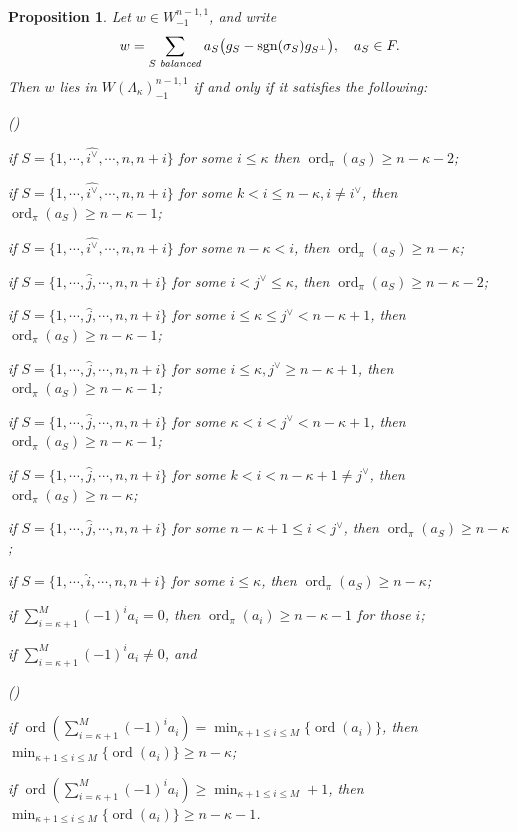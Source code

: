 \documentclass[pdflatex,sn-mathphys-num]{sn-jnl}%
\theoremstyle{thmstyleone}%
\newtheorem{proposition}[subsubsection]{Proposition}%
\theoremstyle{thmstyletwo}%
\numberwithin{equation}{subsection}
\theoremstyle{thmstylethree}%
\DeclareMathOperator{\ord}{ord}
\DeclareMathOperator{\sgn}{sgn}
\newcommand{\wh}{\widehat}
\newenvironment{altenumerate}
	{\begin{list}
			{(\theenumi) }
			{\usecounter{enumi}
				\setlength{\labelwidth}{0pt}
				\setlength{\labelsep}{0pt}
				\setlength{\leftmargin}{0pt}
				\setlength{\itemsep}{\the\smallskipamount}
				\renewcommand{\theenumi}{\roman{enumi}}
		}}
		{\end{list}}
\newenvironment{altenumerate2}
	{\begin{list}
			{\textup{(\theenumii)} }
			{\usecounter{enumii}
				\setlength{\labelwidth}{0pt}
				\setlength{\labelsep}{0pt}
				\setlength{\leftmargin}{2em}
				\setlength{\itemsep}{\the\smallskipamount}
				\renewcommand{\theenumii}{\alph{enumii}}
		}}
		{\end{list}}
\begin{document}
\begin{proposition}\label{equ_ss-comp:lattice}
	Let $w \in W_{-1}^{n-1,1}$, and write
\begin{equation}\label{equ_ss-comp:lattice-summation}
    w = \sum_{S \text{ \emph{balanced}}}a_S\bigl(g_S - \sgn(\sigma_S) g_{S^\perp}\bigr),
			\quad a_S \in F.
\end{equation}
Then $w$ lies in $W(\Lambda_\kappa)_{-1}^{n-1,1}$ if and only if it satisfies the following:
\begin{altenumerate}			
	\item
	if $S=\{1,\cdots,\wh{i^\vee},\cdots,n,n+i\}$ for some $i\leq \kappa$ then $\ord_\pi(a_S)\geq n-\kappa-2$;
	\item
	if $S=\{1,\cdots,\wh{i^\vee},\cdots,n,n+i\}$ for some $k<i\leq n-\kappa,i\neq i^\vee$, then $\ord_\pi(a_S)\geq n-\kappa-1$;
	\item
	if $S=\{1,\cdots,\wh{i^\vee},\cdots,n,n+i\}$ for some $n-\kappa<i$, then $\ord_\pi(a_S)\geq n-\kappa$;
	\item
	if $S=\{1,\cdots,\wh{j},\cdots,n,n+i\}$ for some $i<j^\vee\leq \kappa$, then $\ord_\pi(a_S)\geq n-\kappa-2$;
	\item
	if $S=\{1,\cdots,\wh{j},\cdots,n,n+i\}$ for some $i\leq \kappa\leq j^\vee<n-\kappa+1$, then $\ord_\pi(a_S)\geq n-\kappa-1$;
	\item
	if $S=\{1,\cdots,\wh{j},\cdots,n,n+i\}$ for some $i\leq \kappa,j^\vee\geq n-\kappa+1$, then $\ord_\pi(a_S)\geq n-\kappa-1$;
	\item
	if $S=\{1,\cdots,\wh{j},\cdots,n,n+i\}$ for some $\kappa<i<j^\vee< n-\kappa+1$, then $\ord_\pi(a_S)\geq n-\kappa-1$;
	\item
	if $S=\{1,\cdots,\wh{j},\cdots,n,n+i\}$ for some $k<i<n-\kappa+1\neq j^\vee$, then $\ord_\pi(a_S)\geq n-\kappa$;
	\item
	if $S=\{1,\cdots,\wh{j},\cdots,n,n+i\}$ for some $n-\kappa+1\leq i<j^\vee$, then $\ord_\pi(a_S)\geq n-\kappa$;
	\item
	if $S=\{1,\cdots,\wh{i},\cdots,n,n+i\}$ for some $i\leq \kappa$, then $\ord_\pi(a_S)\geq n-\kappa$;
	\item
	if $\sum_{i=\kappa+1}^M(-1)^ia_i= 0$, then $\ord_\pi(a_i)\geq n-\kappa-1$ for those $i$;
	\item
	if $\sum_{i=\kappa+1}^M(-1)^ia_i\neq 0$, and
    \begin{altenumerate2}
        \item if $\ord(\sum_{i=\kappa+1}^M(-1)^ia_i)={\displaystyle\min_{\kappa+1\leq i\leq M}\{\ord(a_i)\}}$, then
        ${\displaystyle\min_{\kappa+1\leq i\leq M}\{\ord(a_i)\}}\geq n-\kappa$;
        \item if $\ord(\sum_{i=\kappa+1}^M(-1)^ia_i)\geq{\displaystyle\min_{\kappa+1\leq i\leq M}+1}$, then
    ${\displaystyle\min_{\kappa+1\leq i\leq M}\{\ord(a_i)\}}\geq n-\kappa-1$.
    \end{altenumerate2}
\end{altenumerate}
\end{proposition}
\end{document}
